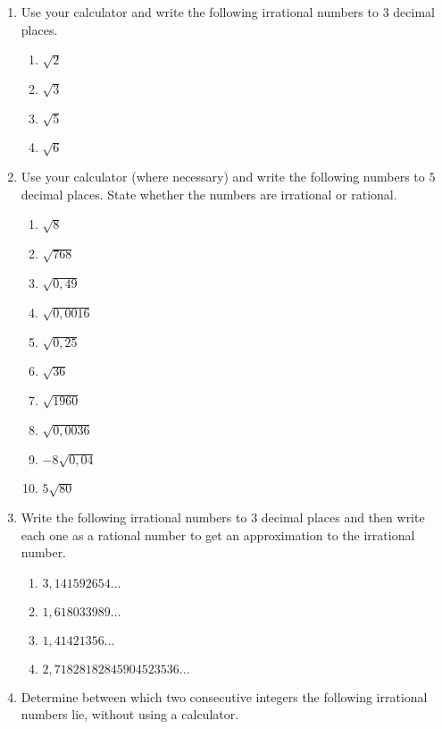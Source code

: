 \begin{eocexercises}{}
\begin{enumerate}[itemsep=5pt, label=\textbf{\arabic*}. ]
\item Use your calculator and write the following irrational numbers to $3$ decimal places.
\begin{multicols}{2}
    \begin{enumerate}[itemsep=0pt, label=\textbf{(\alph*)} ] 
    \item $\sqrt{2}$
    \item $\sqrt{3}$
    \item $\sqrt{5}$
    \item $\sqrt{6}$
    \end{enumerate}
\end{multicols}
\item Use your calculator (where necessary) and write the following numbers to $5$ decimal places. State whether the numbers are irrational or rational.
\begin{multicols}{2}
    \begin{enumerate}[itemsep=0pt, label=\textbf{(\alph*)} ] 
    \item $\sqrt{8}$
    \item $\sqrt{768}$
    \item $\sqrt{0,49}$
    \item $\sqrt{0,0016}$
    \item $\sqrt{0,25}$
    \item $\sqrt{36}$
    \item $\sqrt{1960}$
    \item $\sqrt{0,0036}$
    \item $-8\sqrt{0,04}$
    \item $5\sqrt{80}$
    \end{enumerate}
\end{multicols}
\item Write the following irrational numbers to $3$ decimal places and then write each one as a rational number to get an approximation to the irrational number.
\begin{multicols}{2}
\begin{enumerate}[itemsep=0pt, label=\textbf{(\alph*)} ] 
    \item $3,141592654\ldots$
    \item $1,618033989\ldots$
    \item $1,41421356\ldots$
    \item $2,71828182845904523536\ldots$
    \end{enumerate}
\end{multicols}
\item Determine between which two consecutive integers the following irrational numbers lie, without using a calculator.

\end{enumerate}
\end{eocexercises}
